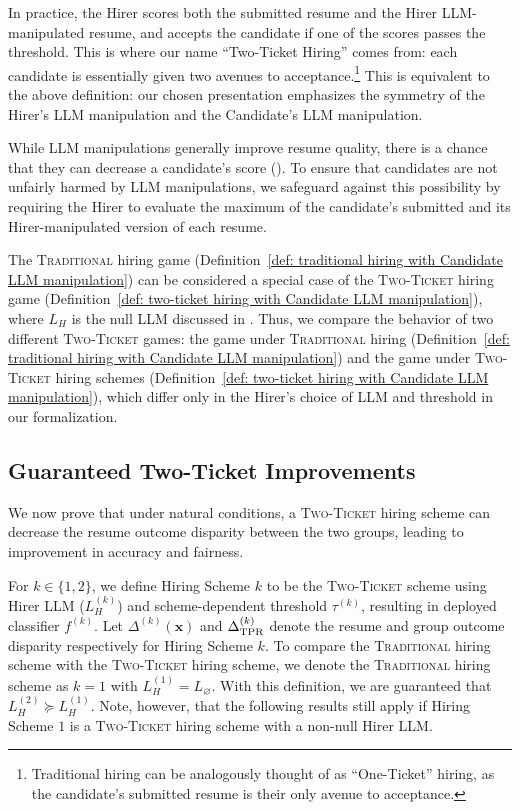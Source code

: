         In practice, the Hirer scores both the submitted resume and the Hirer LLM-manipulated resume, and accepts the candidate if one of the scores passes the threshold. 
        This is where our name ``Two-Ticket Hiring'' comes from: each candidate is essentially given two avenues to acceptance.\footnote{Traditional hiring can be analogously thought of as ``One-Ticket'' hiring, as the candidate's submitted resume is their only avenue to acceptance.} This is equivalent to the above definition: our chosen presentation emphasizes the symmetry of the Hirer's LLM manipulation and the Candidate's LLM manipulation.

        While LLM manipulations generally improve resume quality, there is a chance that they can decrease a candidate's score (). To ensure that candidates are not unfairly harmed by LLM manipulations, we safeguard against this possibility by requiring the Hirer to evaluate the maximum of the candidate's submitted and its Hirer-manipulated version of each resume. 

        The \textsc{Traditional} hiring game (Definition~\ref{def: traditional hiring with Candidate LLM manipulation}) can be considered a special case of the \textsc{Two-Ticket} hiring game (Definition~\ref{def: two-ticket hiring with Candidate LLM manipulation}), where \(L_H\) is the null LLM discussed in . Thus, we compare the behavior of two different \textsc{Two-Ticket} games: the game under \textsc{Traditional} hiring (Definition~\ref{def: traditional hiring with Candidate LLM manipulation}) and the game under \textsc{Two-Ticket} hiring schemes (Definition~\ref{def: two-ticket hiring with Candidate LLM manipulation}), which differ only in the Hirer's choice of LLM and threshold in our formalization.

    \subsection{Guaranteed Two-Ticket Improvements}
        We now prove that under natural 
        conditions, a \textsc{Two-Ticket} hiring scheme can decrease the resume outcome disparity between the two groups, leading to improvement in accuracy and fairness.
    
        For \(k \in \{1, 2\}\), we define Hiring Scheme \(k\) to be the \textsc{Two-Ticket} scheme using Hirer LLM (\(L_H^{(k)}\)) and scheme-dependent threshold \(\tau^{(k)}\), resulting in deployed classifier \(f^{(k)}\). Let \(\Delta^{(k)}(\bm{x})\) and \(\Delta_{\mathrm{TPR}}^{(k)}\) denote the resume and group outcome disparity respectively for Hiring Scheme \(k\). To compare the \textsc{Traditional} hiring scheme with the \textsc{Two-Ticket} hiring scheme, we denote the \textsc{Traditional} hiring scheme as $k=1$ with \(L_H^{(1)} = L_\varnothing\). With this definition, we are guaranteed that \(L_H^{(2)} \succeq L_H^{(1)}\). Note, however, that the following results still apply if Hiring Scheme \(1\) is a \textsc{Two-Ticket} hiring scheme with a non-null Hirer LLM.


